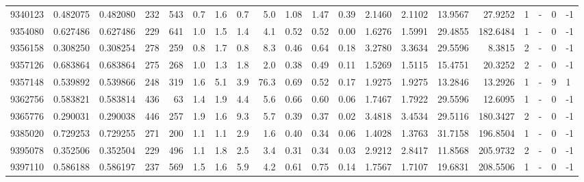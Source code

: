 \begin{tabular}{rrrrrrrrrrrrrrrrrlrl}
   9340123 & 0.482075 &   0.482080 &  232 &  543 &      0.7 &      1.6 &     0.7 &      5.0 &       1.08 &        1.47 &        0.39 &  2.1460 &  2.1102 &   13.9567 &   27.9252 &       1 &             - &        0 &        -1 \\
   9354080 & 0.627486 &   0.627486 &  229 &  641 &      1.0 &      1.5 &     1.4 &      4.1 &       0.52 &        0.52 &        0.00 &  1.6276 &  1.5991 &   29.4855 &  182.6484 &       1 &             - &        0 &        -1 \\
   9356158 & 0.308250 &   0.308254 &  278 &  259 &      0.8 &      1.7 &     0.8 &      8.3 &       0.46 &        0.64 &        0.18 &  3.2780 &  3.3634 &   29.5596 &    8.3815 &       2 &             - &        0 &        -1 \\
   9357126 & 0.683864 &   0.683864 &  275 &  268 &      1.0 &      1.3 &     1.8 &      2.0 &       0.38 &        0.49 &        0.11 &  1.5269 &  1.5115 &   15.4751 &   20.3252 &       2 &             - &        0 &        -1 \\
   9357148 & 0.539892 &   0.539866 &  248 &  319 &      1.6 &      5.1 &     3.9 &     76.3 &       0.69 &        0.52 &        0.17 &  1.9275 &  1.9275 &   13.2846 &   13.2926 &       1 &             - &        9 &         1 \\
   9362756 & 0.583821 &   0.583814 &  436 &   63 &      1.4 &      1.9 &     4.4 &      5.6 &       0.66 &        0.60 &        0.06 &  1.7467 &  1.7922 &   29.5596 &   12.6095 &       1 &             - &        0 &        -1 \\
   9365776 & 0.290031 &   0.290038 &  446 &  257 &      1.9 &      1.6 &     9.3 &      5.7 &       0.39 &        0.37 &        0.02 &  3.4818 &  3.4534 &   29.5116 &  180.3427 &       2 &             - &        0 &        -1 \\
   9385020 & 0.729253 &   0.729255 &  271 &  200 &      1.1 &      1.1 &     2.9 &      1.6 &       0.40 &        0.34 &        0.06 &  1.4028 &  1.3763 &   31.7158 &  196.8504 &       1 &             - &        0 &        -1 \\
   9395078 & 0.352506 &   0.352504 &  229 &  496 &      1.1 &      1.8 &     2.5 &      3.4 &       0.31 &        0.34 &        0.03 &  2.9212 &  2.8417 &   11.8568 &  205.9732 &       2 &             - &        0 &        -1 \\
   9397110 & 0.586188 &   0.586197 &  237 &  569 &      1.5 &      1.6 &     5.9 &      4.2 &       0.61 &        0.75 &        0.14 &  1.7567 &  1.7107 &   19.6831 &  208.5506 &       1 &             - &        0 &        -1 \\

\end{tabular}
